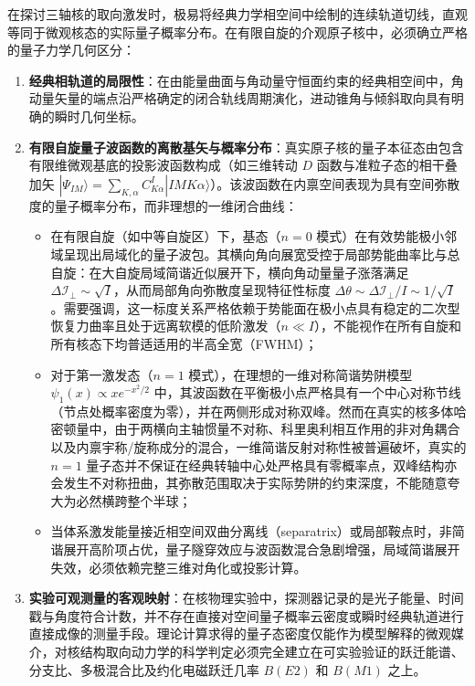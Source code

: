 在探讨三轴核的取向激发时，极易将经典力学相空间中绘制的连续轨道切线，直观等同于微观核态的实际量子概率分布。在有限自旋的介观原子核中，必须确立严格的量子力学几何区分：
\begin{enumerate}
\item \textbf{经典相轨道的局限性}：在由能量曲面与角动量守恒面约束的经典相空间中，角动量矢量的端点沿严格确定的闭合轨线周期演化，进动锥角与倾斜取向具有明确的瞬时几何坐标。
\item \textbf{有限自旋量子波函数的离散基矢与概率分布}：真实原子核的量子本征态由包含有限维微观基底的投影波函数构成（如三维转动 $D$ 函数与准粒子态的相干叠加矢 $|\Psi_{IM}\rangle = \sum_{K,\alpha} C_{K\alpha}^I |I M K \alpha\rangle$）。该波函数在内禀空间表现为具有空间弥散度的量子概率分布，而非理想的一维闭合曲线：
\begin{itemize}
\item 在有限自旋（如中等自旋区）下，基态（$n=0$ 模式）在有效势能极小邻域呈现出局域化的量子波包。其横向角向展宽受控于局部势能曲率比与总自旋：在大自旋局域简谐近似展开下，横向角动量量子涨落满足 $\Delta \mathcal{I}_\perp \sim \sqrt{I}$，从而局部角向弥散度呈现特征性标度 $\Delta \theta \sim \Delta \mathcal{I}_\perp / I \sim 1/\sqrt{I}$。需要强调，这一标度关系严格依赖于势能面在极小点具有稳定的二次型恢复力曲率且处于远离软模的低阶激发（$n \ll I$），不能视作在所有自旋和所有核态下均普适适用的半高全宽（FWHM）；
\item 对于第一激发态（$n=1$ 模式），在理想的一维对称简谐势阱模型 $\psi_1(x) \propto x e^{-x^2/2}$ 中，其波函数在平衡极小点严格具有一个中心对称节线（节点处概率密度为零），并在两侧形成对称双峰。然而在真实的核多体哈密顿量中，由于两横向主轴惯量不对称、科里奥利相互作用的非对角耦合以及内禀宇称/旋称成分的混合，一维简谐反射对称性被普遍破坏，真实的 $n=1$ 量子态并不保证在经典转轴中心处严格具有零概率点，双峰结构亦会发生不对称扭曲，其弥散范围取决于实际势阱的约束深度，不能随意夸大为必然横跨整个半球；
\item 当体系激发能量接近相空间双曲分离线（separatrix）或局部鞍点时，非简谐展开高阶项占优，量子隧穿效应与波函数混合急剧增强，局域简谐展开失效，必须依赖完整三维对角化或投影计算。
\end{itemize}
\item \textbf{实验可观测量的客观映射}：在核物理实验中，探测器记录的是光子能量、时间戳与角度符合计数，并不存在直接对空间量子概率云密度或瞬时经典轨道进行直接成像的测量手段。理论计算求得的量子态密度仅能作为模型解释的微观媒介，对核结构取向动力学的科学判定必须完全建立在可实验验证的跃迁能谱、分支比、多极混合比及约化电磁跃迁几率 $B(E2)$ 和 $B(M1)$ 之上。
\end{enumerate}

